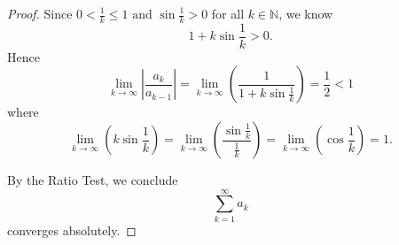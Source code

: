 \begin{Exercise}
\begin{proof}
Since $0<\frac{1}{k}\leq1 \mbox{ and } \sin{\frac{1}{k}} > 0$ for all $k\in\mathbb{N}$, we know 
$$ 
1+k\sin{\frac{1}{k}} > 0.
$$
Hence 
$$ 
\lim_{k\to\infty}\left|\frac{a_k}{a_{k-1}}\right| 
= \lim_{k\to\infty}\left(\frac{1}{1+k\sin{\frac{1}{k}}}\right) 
= \frac{1}{2} < 1 
$$ 
where 
$$ 
\lim_{k\to\infty}\left(k\sin{\frac{1}{k}}\right) 
= \lim_{k\to\infty}\left(\frac{\sin{\frac{1}{k}}}{\frac{1}{k}}\right) 
= \lim_{k\to\infty}\left(\cos{\frac{1}{k}}\right) 
= 1.
$$

By the Ratio Test, we conclude 
$$
\sum_{k=1}^{\infty}a_k
$$
converges absolutely.
\end{proof}
\end{Exercise}
